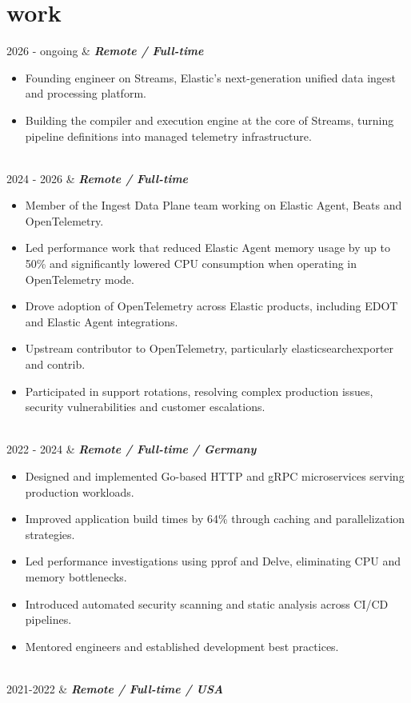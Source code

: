 \documentclass[]{cv-mauri}
\begin{document}
\section*{work}
\begin{tabularcv}
	2026 - ongoing   &   
				\textbf{\textit{Remote / Full-time}}

		\begin{itemize}
			\item Founding engineer on Streams, Elastic's next-generation unified data ingest and processing platform.
			\item Building the compiler and execution engine at the core of Streams, turning pipeline definitions into managed telemetry infrastructure.
		\end{itemize}
				\\[\vspacepar]
	2024 - 2026   &   
				\textbf{\textit{Remote / Full-time}}

		\begin{itemize}
			\item Member of the Ingest Data Plane team working on Elastic Agent, Beats and OpenTelemetry.
			\item Led performance work that reduced Elastic Agent memory usage by up to 50\% and significantly lowered CPU consumption when operating in OpenTelemetry mode.
			\item Drove adoption of OpenTelemetry across Elastic products, including EDOT and Elastic Agent integrations.
			\item Upstream contributor to OpenTelemetry, particularly elasticsearchexporter and contrib.
			\item Participated in support rotations, resolving complex production issues, security vulnerabilities and customer escalations.
		\end{itemize}
				\\[\vspacepar]
	2022 - 2024   &   
					\textbf{\textit{Remote / Full-time / Germany}}

			\begin{itemize}
				\item Designed and implemented Go-based HTTP and gRPC microservices serving production workloads.
				\item Improved application build times by 64\% through caching and parallelization strategies.
				\item Led performance investigations using pprof and Delve, eliminating CPU and memory bottlenecks.
				\item Introduced automated security scanning and static analysis across CI/CD pipelines.
				\item Mentored engineers and established development best practices.
			\end{itemize}
					\\[\vspacepar]
	2021-2022   &   
					\textbf{\textit{Remote / Full-time / USA}}


\end{tabularcv}
\end{document}
